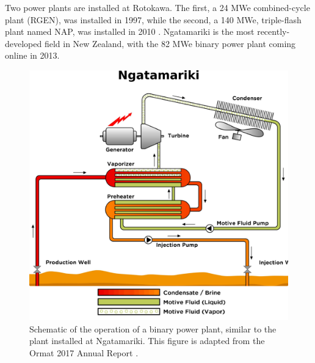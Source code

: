 Two power plants are installed at Rotokawa. The first, a 24 \acrfull{MWe} combined-cycle plant (\acrfull{RGEN}), was installed in 1997, while the second, a 140 \acrshort{MWe}, triple-flash plant named \acrfull{NAP}, was installed in 2010 \citep{McNamara_2016}. Ngatamariki is the most recently-developed field in New Zealand, with the 82 \acrshort{MWe} binary power plant coming online in 2013.

\begin{figure}[h!]
\begin{center}
\includegraphics[width=\columnwidth]{Chapter_1_Intro/figures/ORMAT_techs_overview/Ngatamariki_schematic}
\caption[Schematics diagram of the Ngatamariki geothermal power plant design]{{
Schematic of the operation of a binary power plant, similar to the plant installed at Ngatamariki. This figure is adapted from the Ormat 2017 Annual Report \citep{Ormat_2018}.
{\label{nga_plant}}%
}}
\end{center}
\end{figure}


